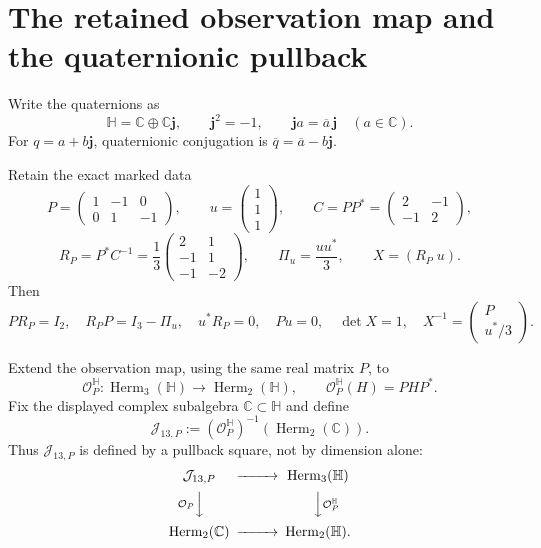\documentclass[11pt]{article}
\theoremstyle{definition}
\theoremstyle{remark}
\newcommand{\C}{\mathbb C}
\newcommand{\Hh}{\mathbb H}
\newcommand{\Herm}{\operatorname{Herm}}
\newcommand{\cJ}{\mathcal J}
\newcommand{\cO}{\mathcal O}
\newcommand{\bj}{\mathbf j}
\begin{document}
\section{The retained observation map and the quaternionic pullback}

Write the quaternions as
\begin{equation}\label{eq:H-decomp}
 \Hh=\C\oplus\C\bj,
 \qquad \bj^2=-1,
 \qquad \bj a=\overline a\,\bj\quad(a\in\C).
\end{equation}
For $q=a+b\bj$, quaternionic conjugation is
$\overline q=\overline a-b\bj$.

Retain the exact marked data
\begin{equation}\label{eq:P-data}
 P=\begin{pmatrix}1&-1&0\\0&1&-1\end{pmatrix},
 \qquad
 u=\begin{pmatrix}1\\1\\1\end{pmatrix},
 \qquad
 C=PP^*=\begin{pmatrix}2&-1\\-1&2\end{pmatrix},
\end{equation}
\begin{equation}\label{eq:R-data}
 R_P=P^*C^{-1}
 =\frac13\begin{pmatrix}2&1\\-1&1\\-1&-2\end{pmatrix},
 \qquad
 \Pi_u=\frac{uu^*}{3},
 \qquad X=(R_P\;u).
\end{equation}
Then
\begin{equation}\label{eq:split}
 PR_P=I_2,
 \quad R_PP=I_3-\Pi_u,
 \quad u^*R_P=0,
 \quad Pu=0,
 \quad \det X=1,
 \quad X^{-1}=\begin{pmatrix}P\\u^*/3\end{pmatrix}.
\end{equation}

Extend the observation map, using the same real matrix $P$, to
\begin{equation}\label{eq:OH}
 \cO_P^{\Hh}:\Herm_3(\Hh)\longrightarrow\Herm_2(\Hh),
 \qquad \cO_P^{\Hh}(H)=PHP^*.
\end{equation}
Fix the displayed complex subalgebra $\C\subset\Hh$ and define
\begin{equation}\label{eq:J13-pullback}
 \boxed{
 \cJ_{13,P}:=(\cO_P^{\Hh})^{-1}(\Herm_2(\C)).}
\end{equation}
Thus $\cJ_{13,P}$ is defined by a pullback square, not by dimension alone:
\begin{equation}\label{eq:pullback-square}
\begin{CD}
 \cJ_{13,P}@>>>\Herm_3(\Hh)\\
 @V{\cO_P}VV @VV{\cO_P^{\Hh}}V\\
 \Herm_2(\C)@>>>\Herm_2(\Hh).
\end{CD}
\end{equation}
\end{document}
